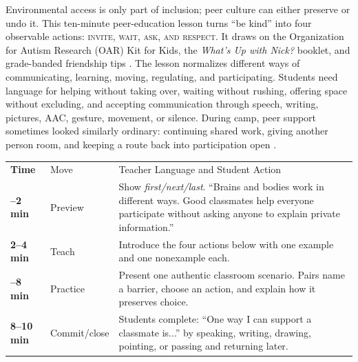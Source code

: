 
\vspace{-0.5cm}

Environmental access is only part of inclusion; peer culture can either preserve or undo it. This ten-minute peer-education lesson turns ``be kind'' into four observable actions: \textsc{invite, wait, ask, and respect}. It draws on the Organization for Autism Research (OAR) Kit for Kids, the \textit{What's Up with Nick?} booklet, and grade-banded friendship tips \citep{oar2026kit,oar2026nick,oar2026tips}. The lesson normalizes different ways of communicating, learning, moving, regulating, and participating. Students need language for helping without taking over, waiting without rushing, offering space without excluding, and accepting communication through speech, writing, pictures, AAC, gesture, movement, or silence. During camp, peer support sometimes looked similarly ordinary: continuing shared work, giving another person room, and keeping a route back into participation open \citep{campEvidence2026}.


\renewcommand{\arraystretch}{1.15}
\setlength{\tabcolsep}{5pt}

\begin{tabularx}{\textwidth}{
>{\bfseries\RaggedRight\arraybackslash}p{0.70in}
>{\RaggedRight\arraybackslash}p{0.90in}
>{\RaggedRight\arraybackslash}X}

\rowcolor{PrimaryRed}
\color{white}Time &
\color{white}Move &
\color{white}Teacher Language and Student Action \\

0--2 min & Preview &
Show \textit{first/next/last}. ``Brains and bodies work in different ways. Good classmates help everyone participate without asking anyone to explain private information.'' \\

\rowcolor{SoftGray}
2--4 min & Teach &
Introduce the four actions below with one example and one nonexample each. \\

4--8 min & Practice &
Present one authentic classroom scenario. Pairs name a barrier, choose an action, and explain how it preserves choice. \\

\rowcolor{SoftGray}
8--10 min & Commit/close &
Students complete: ``One way I can support a classmate is...'' by speaking, writing, drawing, pointing, or passing and returning later. \\

\end{tabularx}

